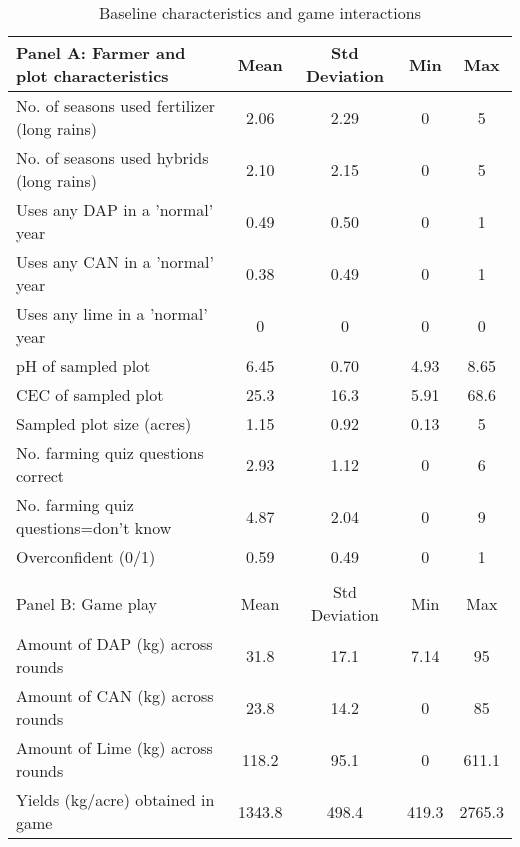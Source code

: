 \begin{table}[htbp]
\centering
\hspace*{-1.2cm}
\begin{threeparttable}
\caption{Baseline characteristics and game interactions }
\label{tab:farmchar}
\begin{tabular}{l cccc}
\hline
\hline
Panel A: Farmer and plot characteristics                    &        Mean&Std Deviation&         Min&         Max\\
\hline
No. of seasons used fertilizer (long rains)&        2.06&        2.29&           0&           5\\
No. of seasons used hybrids  (long rains)&        2.10&        2.15&           0&           5\\
Uses any DAP in a 'normal' year&        0.49&        0.50&           0&           1\\
Uses any CAN in a 'normal' year&        0.38&        0.49&           0&           1\\
Uses any lime in a 'normal' year&           0&           0&           0&           0\\
pH of sampled plot  &        6.45&        0.70&        4.93&        8.65\\
CEC of sampled plot &        25.3&        16.3&        5.91&        68.6\\
Sampled plot size (acres)&        1.15&        0.92&        0.13&           5\\
No. farming quiz questions correct&        2.93&        1.12&           0&           6\\
No. farming quiz questions=don’t know&        4.87&        2.04&           0&           9\\
Overconfident (0/1) &        0.59&        0.49&           0&           1\\
& & & & \\
\hline
%
Panel B: Game play                    &        Mean&Std Deviation&         Min&         Max\\
\hline
Amount of DAP (kg) across rounds&        31.8&        17.1&        7.14&          95\\
Amount of CAN (kg) across rounds&        23.8&        14.2&           0&          85\\
Amount of Lime (kg) across rounds&       118.2&        95.1&           0&       611.1\\
Yields (kg/acre) obtained in game&      1343.8&       498.4&       419.3&      2765.3\\

\end{tabular}
\end{threeparttable}
\end{table}
